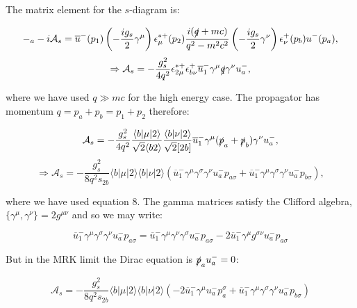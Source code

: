 			The matrix element for the $s$-diagram is:

			\begin{equation}
			-_a-i\mathcal{A}_s=\overline{u}^-(p_1)\left(-\frac{ig_s}{2}\gamma^\mu\right)\epsilon_\mu^{*+}(p_2)
				\frac{i(\slashed q+mc)}{q^2-m^2c^2}\left(-\frac{ig_s}{2}\gamma^\nu\right)\epsilon^+_\nu(p_b)u^-(p_a),
			\end{equation}
			\begin{equation*}
				\Rightarrow \mathcal{A}_s=-\frac{g^2_s}{4q^2}\epsilon^{*+}_{2\mu}\epsilon^+_{b\nu}\overline{u}^-_1\gamma^\mu\slashed q\gamma^\nu u^-_a,
			\end{equation*}

			where we have used $q\gg mc$ for the high energy case.  The propagator has momentum $q=p_a+p_b=p_1+p_2$ therefore:

			\begin{equation}
				\mathcal{A}_s=-\frac{g^2_s}{4q^2}\frac{\langle{b}|\mu|2\rangle}{\sqrt{2}\langle{b2\rangle}}
				\frac{\langle{b}|\nu|2\rangle}{\sqrt{2}[2b]}\overline{u}^-_1\gamma^\mu(\slashed{p}_a+\slashed{p}_b)\gamma^\nu u^-_a,
				\end{equation}
			\begin{equation*}
				\Rightarrow\mathcal{A}_s=-\frac{g^2_s}{8q^2s_{2b}}\langle{b}|\mu|2\rangle\langle{b}|\nu|2\rangle
				\left(\overline{u}^-_1\gamma^\mu\gamma^\sigma\gamma^\nu u^-_ap_{a\sigma}+
				\overline{u}^-_1\gamma^\mu\gamma^\sigma\gamma^\nu u^-_ap_{b\sigma}\right),
			\end{equation*}

			where we have used equation 8.  The gamma matrices satisfy the Clifford algebra, $\{\gamma^\mu, \gamma^\nu\}=2g^{\mu\nu}$ and so we may write:

			\begin{equation}
				\overline{u}^-_1\gamma^\mu\gamma^\sigma\gamma^\nu u^-_ap_{a\sigma}=
				\overline{u}^-_1\gamma^\mu\gamma^\nu\gamma^\sigma u^-_ap_{a\sigma} -
				2\overline{u}^-_1\gamma^\mu g^{\sigma\nu}u^-_ap_{a\sigma}
			\end{equation}

			But in the MRK limit the Dirac equation is $\slashed{p}_au^-_a=0$:

			\begin{equation}
				\mathcal{A}_s=-\frac{g^2_s}{8q^2s_{2b}}\langle{b}|\mu|2\rangle\langle{b}|\nu|2\rangle
				\left(-2\overline{u}^-_1\gamma^\mu u^-_ap_{a}^\sigma+\overline{u}^-_1\gamma^\mu\gamma^\sigma\gamma^\nu u^-_ap_{b\sigma}\right)
			\end{equation}

